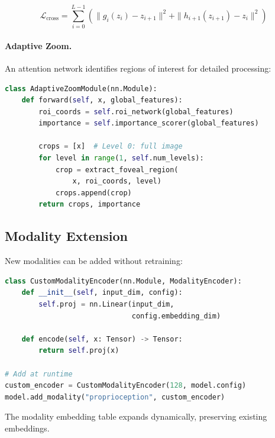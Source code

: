 \begin{equation}
    \mathcal{L}_{\text{cross}} = \sum_{i=0}^{L-1} \left( \|g_i(z_i) - z_{i+1}\|^2 + \|h_{i+1}(z_{i+1}) - z_i\|^2 \right)
\end{equation}

\paragraph{Adaptive Zoom.} An attention network identifies regions of interest for detailed processing:

\begin{lstlisting}[language=Python]
class AdaptiveZoomModule(nn.Module):
    def forward(self, x, global_features):
        roi_coords = self.roi_network(global_features)
        importance = self.importance_scorer(global_features)

        crops = [x]  # Level 0: full image
        for level in range(1, self.num_levels):
            crop = extract_foveal_region(
                x, roi_coords, level)
            crops.append(crop)
        return crops, importance
\end{lstlisting}

\subsection{Modality Extension}

New modalities can be added without retraining:

\begin{lstlisting}[language=Python]
class CustomModalityEncoder(nn.Module, ModalityEncoder):
    def __init__(self, input_dim, config):
        self.proj = nn.Linear(input_dim,
                              config.embedding_dim)

    def encode(self, x: Tensor) -> Tensor:
        return self.proj(x)

# Add at runtime
custom_encoder = CustomModalityEncoder(128, model.config)
model.add_modality("proprioception", custom_encoder)
\end{lstlisting}

The modality embedding table expands dynamically, preserving existing embeddings.

